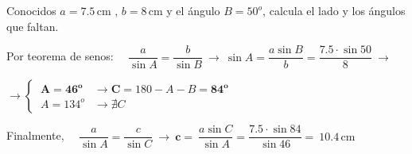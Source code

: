 \begin{miejemplo}

Conocidos $a=7.5\, \mathrm{cm}$ , $b=8\, \mathrm{cm}$ y el ángulo $B=50^o$, calcula el lado  y los ángulos que faltan.

\vspace{5mm} Por teorema de senos: $\quad \dfrac{a}{\sin A}=\dfrac{b}{\sin B} \ \to \ \sin A=\dfrac{a\sin B}{b}=\dfrac{7.5\cdot \sin 50}{8} \ \to $

\vspace{2mm} $\to \begin{cases} \ \boldsymbol{ A= 46^o} &\to  \boldsymbol C=180-A-B= \boldsymbol{ 84^o} \\ \ A=134^o &\to \nexists C \end{cases}$

\vspace{2mm} Finalmente, $\quad \dfrac{a}{\sin A}=\dfrac{c}{\sin C } \ \to \ \boldsymbol c=\ \dfrac{a\sin C}{\sin A}=\dfrac{7.5\cdot \sin 84}{\sin 46}=\ \boldsymbol{ 10.4 \,\mathrm{cm} }$
\end{miejemplo} 

